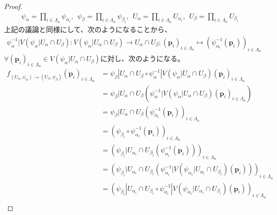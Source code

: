 \documentclass[dvipdfmx]{jsarticle}
\begin{document}
\begin{proof}
\begin{align*}
\psi_{\alpha} = \prod_{i \in \varLambda_{n}} \psi_{\alpha_{i}},\ \ \psi_{\beta} = \prod_{i \in \varLambda_{n}} \psi_{\beta_{i}},\ \ U_{\alpha} = \prod_{i \in \varLambda_{n}} U_{\alpha_{i}},\ \ U_{\beta} = \prod_{i \in \varLambda_{n}} U_{\beta_{i}}
\end{align*}
上記の議論と同様にして、次のようになることから、
\begin{align*}
\psi_{\alpha}^{- 1}|V\left( \psi_{\alpha}|U_{\alpha} \cap U_{\beta} \right):V\left( \psi_{\alpha}|U_{\alpha} \cap U_{\beta} \right) \rightarrow U_{\alpha} \cap U_{\beta};\left( \mathbf{p}_{i} \right)_{i \in \varLambda_{n}} \mapsto \left( \psi_{\alpha_{i}}^{- 1}\left( \mathbf{p}_{i} \right) \right)_{i \in \varLambda_{n}}
\end{align*}
$\forall\left( \mathbf{p}_{i} \right)_{i \in \varLambda_{n}} \in V\left( \psi_{\alpha}|U_{\alpha} \cap U_{\beta} \right)$に対し、次のようになる。
\begin{align*}
f_{\left( U_{\alpha},\psi_{\alpha} \right) \rightarrow \left( U_{\beta},\psi_{\beta} \right)}\left( \mathbf{p}_{i} \right)_{i \in \varLambda_{n}} &= \psi_{\beta}|U_{\alpha} \cap U_{\beta} \circ \psi_{\alpha}^{- 1}|V\left( \psi_{\alpha}|U_{\alpha} \cap U_{\beta} \right)\left( \mathbf{p}_{i} \right)_{i \in \varLambda_{n}}\\
&= \psi_{\beta}|U_{\alpha} \cap U_{\beta}\left( \psi_{\alpha}^{- 1}|V\left( \psi_{\alpha}|U_{\alpha} \cap U_{\beta} \right)\left( \mathbf{p}_{i} \right)_{i \in \varLambda_{n}} \right)\\
&= \psi_{\beta}|U_{\alpha} \cap U_{\beta}\left( \psi_{\alpha_{i}}^{- 1}\left( \mathbf{p}_{i} \right) \right)_{i \in \varLambda_{n}}\\
&= \left( \psi_{\beta_{i}} \circ \psi_{\alpha_{i}}^{- 1}\left( \mathbf{p}_{i} \right) \right)_{i \in \varLambda_{n}}\\
&= \left( \psi_{\beta_{i}}|U_{\alpha_{i}} \cap U_{\beta_{i}}\left( \psi_{\alpha_{i}}^{- 1}\left( \mathbf{p}_{i} \right) \right) \right)_{i \in \varLambda_{n}}\\
&= \left( \psi_{\beta_{i}}|U_{\alpha_{i}} \cap U_{\beta_{i}}\left( \psi_{\alpha_{i}}^{- 1}|V\left( \psi_{\alpha_{i}}|U_{\alpha_{i}} \cap U_{\beta_{i}} \right)\left( \mathbf{p}_{i} \right) \right) \right)_{i \in \varLambda_{n}}\\
&= \left( \psi_{\beta_{i}}|U_{\alpha_{i}} \cap U_{\beta_{i}} \circ \psi_{\alpha_{i}}^{- 1}|V\left( \psi_{\alpha_{i}}|U_{\alpha_{i}} \cap U_{\beta_{i}} \right)\left( \mathbf{p}_{i} \right) \right)_{i \in \varLambda_{n}}\\

\end{align*}
\end{proof}
\end{document}
